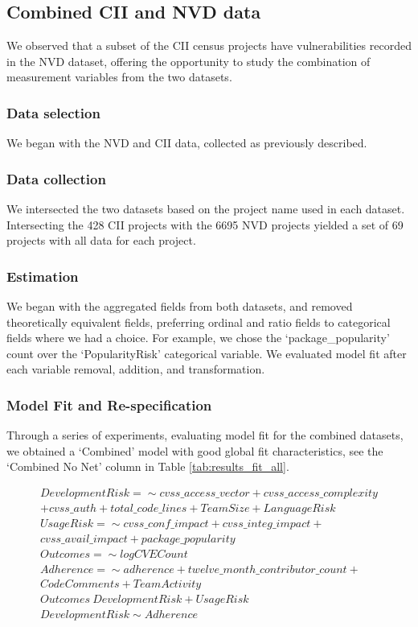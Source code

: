 
\subsection{Combined CII and NVD data}
We observed that a subset of the CII census projects have vulnerabilities recorded in the NVD dataset, offering the opportunity to study the combination of measurement variables from the two datasets. 

\subsubsection{Data selection}
We began with the NVD and CII data, collected as previously described. 

\subsubsection{Data collection}
We intersected the two datasets based on the project name used in each dataset. Intersecting the 428 CII projects with the 6695 NVD projects yielded a set of 69 projects with all data for each project. 

\subsubsection{Estimation}
We began with the aggregated fields from both datasets, and removed theoretically equivalent fields, preferring ordinal and ratio fields to categorical fields where we had a choice. For example, we chose the `package\_popularity' count over the `PopularityRisk' categorical variable. We evaluated model fit after each variable removal, addition, and transformation.

\subsubsection{Model Fit and Re-specification}
Through a series of experiments, evaluating model fit for the combined datasets, we obtained a `Combined' model with good global fit characteristics, see the `Combined No Net' column in Table \ref{tab:results_fit_all}.

\begin{align*}
	DevelopmentRisk =\sim cvss\_access\_vector + cvss\_access\_complexity\\
	 + cvss\_auth + total\_code\_lines + TeamSize + LanguageRisk\\
	UsageRisk =\sim cvss\_conf\_impact + cvss\_integ\_impact +\\ cvss\_avail\_impact + package\_popularity\\
	Outcomes =\sim  logCVECount \\
	Adherence =\sim adherence + twelve\_month\_contributor\_count +\\ CodeComments + TeamActivity \\
	Outcomes ~ DevelopmentRisk + UsageRisk\\
	DevelopmentRisk \sim  Adherence\\
\end{align*}

